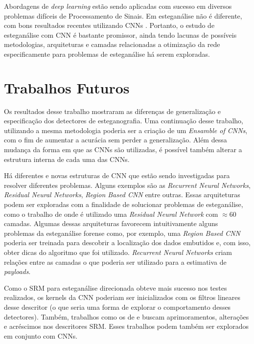 Abordagens de \textit{deep learning} estão sendo aplicadas com sucesso em diversos problemas difíceis de Processamento de Sinais. Em esteganálise não é diferente, com bons resultados recentes utilizando CNNs \citeauthor{tan2014stacked,qian2015deep,cnn_base,xu2016ensemble}. Portanto, o estudo de esteganálise com CNN é bastante promissor, ainda tendo lacunas de possíveis metodologias, arquiteturas e camadas relacionadas a otimização da rede especificamente para problemas de esteganálise há serem exploradas.

\section{Trabalhos Futuros}
\label{sec:trabalhosFuturos}

Os resultados desse trabalho mostraram as diferenças de generalização e especificação dos detectores de esteganografia. Uma continuação desse trabalho, utilizando a mesma metodologia poderia ser a criação de um \textit{Ensamble of CNNs}, com o fim de aumentar a acurácia sem perder a generalização. Além dessa mudança da forma em que as CNNs são utilizadas, é possível também alterar a estrutura interna de cada uma das CNNs.

Há diferentes e novas estruturas de CNN que estão sendo investigadas para resolver diferentes problemas. Alguns exemplos são as \textit{Recurrent Neural Networks}, \textit{Residual Neural Networks}, \textit{Region Based CNN} entre outras. Essas arquiteturas podem ser exploradas com a finalidade de solucionar problemas de esteganálise, como o trabalho de  onde é utilizado uma \textit{Residual Neural Network} com $\approx 60$ camadas. Algumas dessas arquiteturas favorecem intuitivamente alguns problemas da esteganálise forense como, por exemplo, uma \textit{Region Based CNN} poderia ser treinada para descobrir a localização dos dados embutidos e, com isso, obter dicas do algoritmo que foi utilizado. \textit{Recurrent Neural Networks} criam relações entre as camadas o que poderia ser utilizado para a estimativa de \textit{payloads}.

Como o SRM para esteganálise direcionada obteve mais sucesso nos testes realizados, os kernels da CNN poderiam ser inicializados com os filtros lineares desse descritor (o que seria uma forma de explorar o comportamento desses detectores). Também, trabalhos como os de  e  buscam aprimoramentos, alterações e acréscimos nos descritores SRM. Esses trabalhos podem também ser explorados em conjunto com CNNs.

